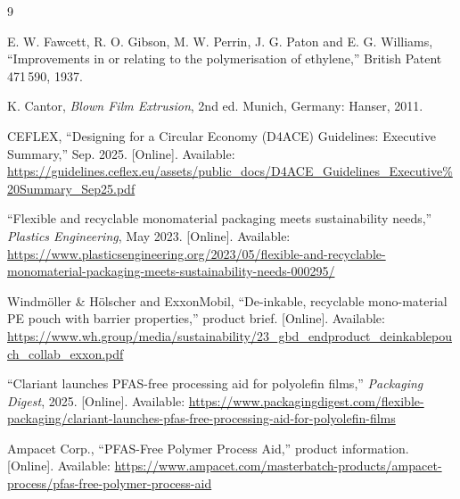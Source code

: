 \documentclass[10pt,twocolumn,a4paper]{article}
\begin{document}
\begin{thebibliography}{9}
\footnotesize
\setlength\itemsep{1pt}

 E. W. Fawcett, R. O. Gibson, M. W. Perrin, J. G. Paton and E. G. Williams, ``Improvements in or relating to the polymerisation of ethylene,'' British Patent 471\,590, 1937.

 K. Cantor, \textit{Blown Film Extrusion}, 2nd ed. Munich, Germany: Hanser, 2011.

 CEFLEX, ``Designing for a Circular Economy (D4ACE) Guidelines: Executive Summary,'' Sep. 2025. [Online]. Available: \url{https://guidelines.ceflex.eu/assets/public_docs/D4ACE_Guidelines_Executive%20Summary_Sep25.pdf}

 ``Flexible and recyclable monomaterial packaging meets sustainability needs,'' \textit{Plastics Engineering}, May 2023. [Online]. Available: \url{https://www.plasticsengineering.org/2023/05/flexible-and-recyclable-monomaterial-packaging-meets-sustainability-needs-000295/}

 Windmöller \& Hölscher and ExxonMobil, ``De-inkable, recyclable mono-material PE pouch with barrier properties,'' product brief. [Online]. Available: \url{https://www.wh.group/media/sustainability/23_gbd_endproduct_deinkablepouch_collab_exxon.pdf}

 ``Clariant launches PFAS-free processing aid for polyolefin films,'' \textit{Packaging Digest}, 2025. [Online]. Available: \url{https://www.packagingdigest.com/flexible-packaging/clariant-launches-pfas-free-processing-aid-for-polyolefin-films}

 Ampacet Corp., ``PFAS-Free Polymer Process Aid,'' product information. [Online]. Available: \url{https://www.ampacet.com/masterbatch-products/ampacet-process/pfas-free-polymer-process-aid}

\end{thebibliography}
\end{document}
